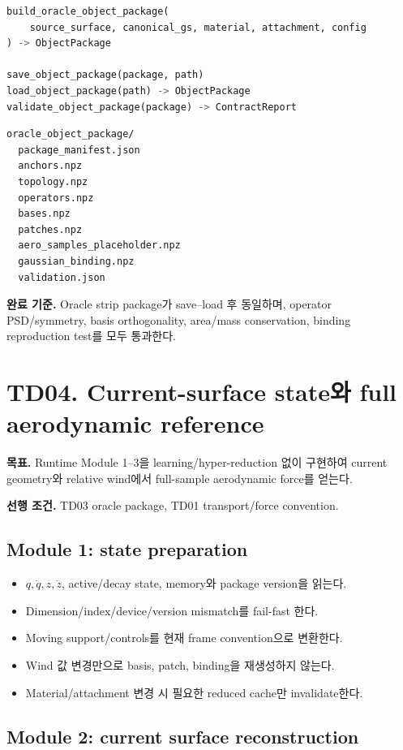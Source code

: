 \documentclass[10pt,a4paper]{article}
\newcommand{\todo}{\textcolor{TodoGray}{\(\square\)}}
\begin{document}
\begin{lstlisting}[language=Python]
build_oracle_object_package(
    source_surface, canonical_gs, material, attachment, config
) -> ObjectPackage

save_object_package(package, path)
load_object_package(path) -> ObjectPackage
validate_object_package(package) -> ContractReport
\end{lstlisting}

\begin{lstlisting}
oracle_object_package/
  package_manifest.json
  anchors.npz
  topology.npz
  operators.npz
  bases.npz
  patches.npz
  aero_samples_placeholder.npz
  gaussian_binding.npz
  validation.json
\end{lstlisting}

\textbf{완료 기준.}
Oracle strip package가 save--load 후 동일하며, operator PSD/symmetry, basis orthogonality,
area/mass conservation, binding reproduction test를 모두 통과한다.

\section{TD04. Current-surface state와 full aerodynamic reference}

\textbf{목표.}
Runtime Module 1--3을 learning/hyper-reduction 없이 구현하여 current geometry와 relative wind에서 full-sample aerodynamic force를 얻는다.

\textbf{선행 조건.} TD03 oracle package, TD01 transport/force convention.

\subsection*{Module 1: state preparation}

\begin{itemize}
  \item[\todo] \(q,\dot q,z,\dot z\), active/decay state, memory와 package version을 읽는다.
  \item[\todo] Dimension/index/device/version mismatch를 fail-fast 한다.
  \item[\todo] Moving support/controls를 현재 frame convention으로 변환한다.
  \item[\todo] Wind 값 변경만으로 basis, patch, binding을 재생성하지 않는다.
  \item[\todo] Material/attachment 변경 시 필요한 reduced cache만 invalidate한다.
\end{itemize}

\subsection*{Module 2: current surface reconstruction}
\end{document}

